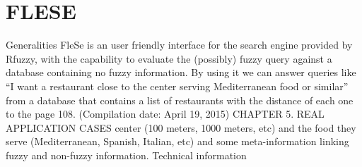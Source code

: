 \documentclass[a4paper,twoside]{article}
\begin{document}

\section{\uppercase{\uppercase{Flese}}}

Generalities
FleSe is an user friendly interface for the search engine provided by Rfuzzy, with the capability to evaluate the (possibly) fuzzy query against a database containing no fuzzy information.
By using it we can answer queries like “I want a restaurant close to the center serving Mediterranean food or similar” from a database that contains a list of restaurants with the distance of each one to the page 108. (Compilation date: April 19, 2015) CHAPTER 5. REAL APPLICATION CASES center (100 meters, 1000 meters, etc) and the food they serve (Mediterranean, Spanish, Italian, etc) and some meta-information linking fuzzy and non-fuzzy information.
Technical information
\end{document}
